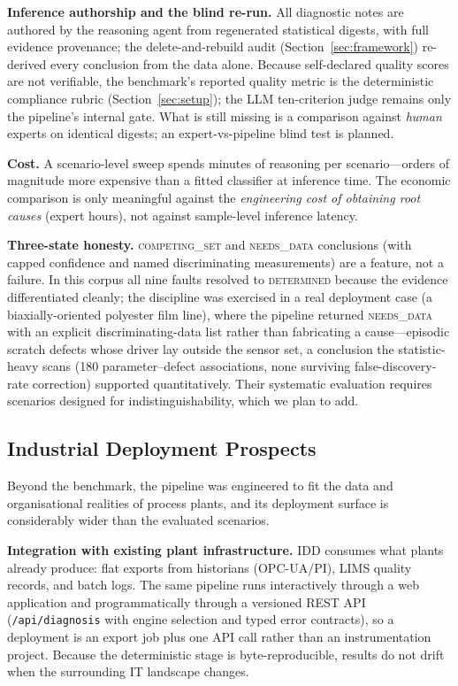 \documentclass[journal]{IEEEtran}
\begin{document}
\textbf{Inference authorship and the blind re-run.} All diagnostic notes are authored by the reasoning agent from regenerated statistical digests, with full evidence provenance; the delete-and-rebuild audit (Section~\ref{sec:framework}) re-derived every conclusion from the data alone. Because self-declared quality scores are not verifiable, the benchmark's reported quality metric is the deterministic compliance rubric (Section~\ref{sec:setup}); the LLM ten-criterion judge remains only the pipeline's internal gate. What is still missing is a comparison against \emph{human} experts on identical digests; an expert-vs-pipeline blind test is planned.

\textbf{Cost.} A scenario-level sweep spends minutes of reasoning per scenario---orders of magnitude more expensive than a fitted classifier at inference time. The economic comparison is only meaningful against the \emph{engineering cost of obtaining root causes} (expert hours), not against sample-level inference latency.

\textbf{Three-state honesty.} \textsc{competing\_set} and \textsc{needs\_data} conclusions (with capped confidence and named discriminating measurements) are a feature, not a failure. In this corpus all nine faults resolved to \textsc{determined} because the evidence differentiated cleanly; the discipline was exercised in a real deployment case (a biaxially-oriented polyester film line), where the pipeline returned \textsc{needs\_data} with an explicit discriminating-data list rather than fabricating a cause---episodic scratch defects whose driver lay outside the sensor set, a conclusion the statistic-heavy scans (180 parameter--defect associations, none surviving false-discovery-rate correction) supported quantitatively. Their systematic evaluation requires scenarios designed for indistinguishability, which we plan to add.

\subsection{Industrial Deployment Prospects}
Beyond the benchmark, the pipeline was engineered to fit the data and organisational realities of process plants, and its deployment surface is considerably wider than the evaluated scenarios.

\textbf{Integration with existing plant infrastructure.} IDD consumes what plants already produce: flat exports from historians (OPC-UA/PI), LIMS quality records, and batch logs. The same pipeline runs interactively through a web application and programmatically through a versioned REST API (\texttt{/api/diagnosis} with engine selection and typed error contracts), so a deployment is an export job plus one API call rather than an instrumentation project. Because the deterministic stage is byte-reproducible, results do not drift when the surrounding IT landscape changes.
\end{document}
